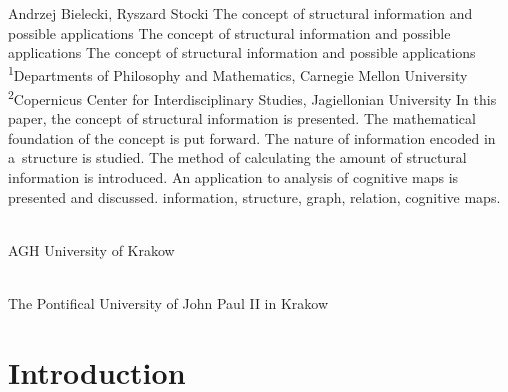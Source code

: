 \begin{artengenv2auth}{Andrzej Bielecki, Ryszard Stocki}
	{The concept of structural information and possible applications}
	{The concept of structural information and possible applications}
	{The concept of structural information and possible applications}
	{\textsuperscript{1}Departments of Philosophy and Mathematics, Carnegie Mellon University\\
		\textsuperscript{2}Copernicus Center for Interdisciplinary Studies, Jagiellonian University}
	{In this paper, the concept of structural information is presented. The mathematical foundation of the concept is put forward. The nature of information encoded in a~structure is studied. The method of calculating the amount of structural information is introduced. An application to analysis of cognitive maps is presented and discussed.}
	{information, structure, graph, relation, cognitive maps.}
	{%
		{\flushright{}\\\subsubsectit\small{AGH University of Krakow}\par}%
		{\flushright{}\\\subsubsectit\small{The Pontifical University of John Paul II in Krakow}\par}%
	}


\section{Introduction}


\end{artengenv2auth}
